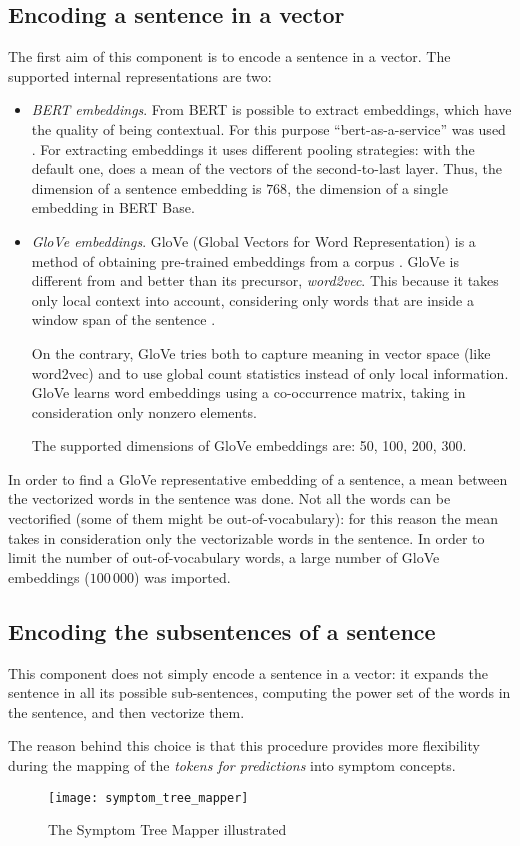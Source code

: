 \subsection{Encoding a sentence in a vector}
The first aim of this component is to encode a sentence in a vector. The supported internal representations are two:
\begin{itemize}
  \item \textit{BERT embeddings}. From BERT is possible to extract embeddings, which have the quality of being contextual. For this purpose ``bert-as-a-service'' was used \cite{baas}. For extracting embeddings it uses different pooling strategies: with the default one, does a mean of the vectors of the second-to-last layer. Thus, the dimension of a sentence embedding is $768$, the dimension of a single embedding in BERT Base.
  \item \textit{GloVe embeddings}. GloVe (Global Vectors for Word Representation) is a method of obtaining pre-trained embeddings from a corpus \cite{glove}. GloVe is different from and better than its precursor, \textit{word2vec}. This because it takes only local context into account, considering only words that are inside a window span of the sentence \cite{word2vec}.
  
  On the contrary, GloVe tries both to capture meaning in vector space (like word2vec) and to use global count statistics instead of only local information. GloVe learns word embeddings using a co-occurrence matrix, taking in consideration only nonzero elements.
  
  The supported dimensions of GloVe embeddings are: 50, 100, 200, 300.
\end{itemize}

In order to find a GloVe representative embedding of a sentence, a mean between the vectorized words in the sentence was done. Not all the words can be vectorified (some of them might be out-of-vocabulary): for this reason the mean takes in consideration only the vectorizable words in the sentence. In order to limit the number of out-of-vocabulary words, a large number of GloVe embeddings ($100\,000$) was imported.

\subsection{Encoding the subsentences of a sentence}
This component does not simply encode a sentence in a vector: it expands the sentence in all its possible sub-sentences, computing the power set of the words in the sentence, and then vectorize them.

The reason behind this choice is that this procedure provides more flexibility during the mapping of the \textit{tokens for predictions} into symptom concepts.

\begin{figure}[h]
\centering
\texttt{[image: symptom\_tree\_mapper]}
\caption{The Symptom Tree Mapper illustrated}
\medskip
\label{fig:symptom_t_m}
\end{figure}
